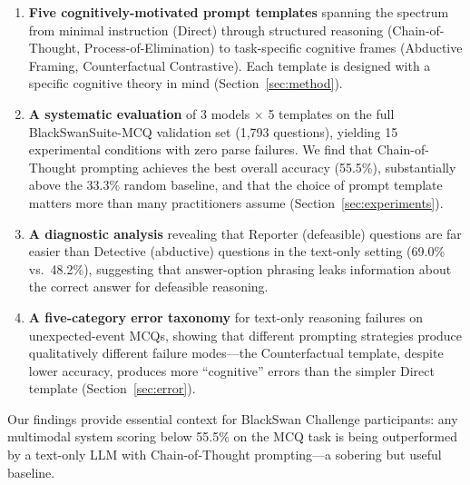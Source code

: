 \begin{enumerate}[leftmargin=*,itemsep=2pt]
    \item \textbf{Five cognitively-motivated prompt templates} spanning the spectrum from minimal instruction (Direct) through structured reasoning (Chain-of-Thought, Process-of-Elimination) to task-specific cognitive frames (Abductive Framing, Counterfactual Contrastive). Each template is designed with a specific cognitive theory in mind (Section~\ref{sec:method}).

    \item \textbf{A systematic evaluation} of 3 models $\times$ 5 templates on the full BlackSwanSuite-MCQ validation set (1{,}793 questions), yielding 15 experimental conditions with zero parse failures. We find that Chain-of-Thought prompting achieves the best overall accuracy (55.5\%), substantially above the 33.3\% random baseline, and that the choice of prompt template matters more than many practitioners assume (Section~\ref{sec:experiments}).

    \item \textbf{A diagnostic analysis} revealing that Reporter (defeasible) questions are far easier than Detective (abductive) questions in the text-only setting (69.0\% vs.\ 48.2\%), suggesting that answer-option phrasing leaks information about the correct answer for defeasible reasoning.

    \item \textbf{A five-category error taxonomy} for text-only reasoning failures on unexpected-event MCQs, showing that different prompting strategies produce qualitatively different failure modes---the Counterfactual template, despite lower accuracy, produces more ``cognitive'' errors than the simpler Direct template (Section~\ref{sec:error}).
\end{enumerate}

Our findings provide essential context for BlackSwan Challenge participants: any multimodal system scoring below 55.5\% on the MCQ task is being outperformed by a text-only LLM with Chain-of-Thought prompting---a sobering but useful baseline.
